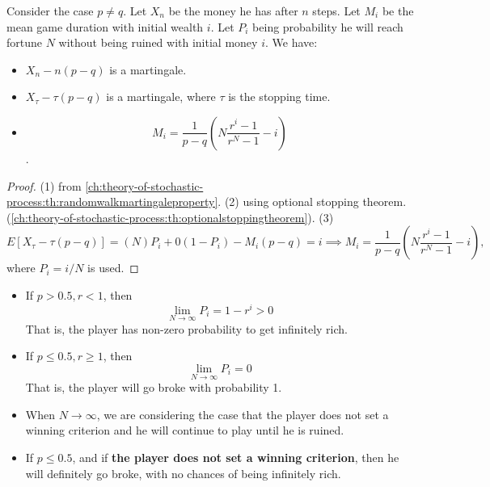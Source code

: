 \begin{refsection}
\begin{lemma}\cite[220]{privault2013understanding}
	Consider the case $p\neq q$. Let $X_n$ be the money he has after $n$ steps. Let $M_i$ be the mean game duration with initial wealth $i$. Let $P_i$ being probability he will reach fortune $N$ without being ruined with initial money $i$. We have:
	\begin{itemize}
		\item $X_n - n(p-q)$ is a martingale.
		\item $X_\tau - \tau(p-q)$ is a martingale, where $\tau$ is the stopping time.
		\item $$M_i = \frac{1}{p-q}(N\frac{r^i - 1}{r^N - 1} - i)$$.
	\end{itemize}
\end{lemma}
\begin{proof}
	(1) from \autoref{ch:theory-of-stochastic-process:th:randomwalkmartingaleproperty}.	
	(2) using optional stopping theorem.(\autoref{ch:theory-of-stochastic-process:th:optionalstoppingtheorem}). (3) $$E[X_\tau - \tau(p-q)] = (N) P_i +  0(1 - P_i) - M_i(p-q) = i \implies M_i = \frac{1}{p-q}(N\frac{r^i - 1}{r^N - 1} - i),$$
	where $P_i = i/N$ is used. 	
\end{proof}


\begin{corollary}\hfill
	\begin{itemize}
		\item If $p > 0.5, r < 1$, then
		$$\lim_{N\to \infty} P_i = 1 - r^i > 0$$
		That is, the player has non-zero probability to get infinitely rich.
		\item If $p \leq 0.5, r \geq 1$, then
		$$\lim_{N\to \infty} P_i = 0 $$
		That is, the player will go broke with probability 1.
	\end{itemize}
\end{corollary}
\begin{remark}[interpretation]\hfill
	\begin{itemize}
		\item When $N\to \infty$, we are considering the case that the player does not set a winning criterion and he will continue to play until he is ruined. 
		\item If $p \leq 0.5$, and if \textbf{the player does not set a winning criterion}, then he will definitely go broke, with no chances of being infinitely rich.
	\end{itemize}
\end{remark}



\end{refsection}
